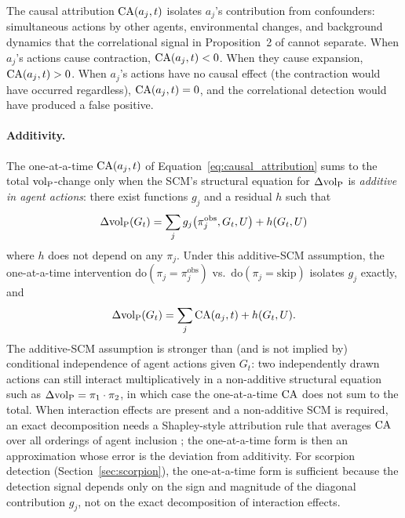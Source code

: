 The causal attribution $\mathrm{CA}(a_j, t)$ isolates $a_j$'s contribution
from confounders: simultaneous actions by other agents, environmental
changes, and background dynamics that the correlational signal in
Proposition~2 of \citet{lasser2026gfm} cannot separate. When $a_j$'s
actions cause contraction, $\mathrm{CA}(a_j, t) < 0$. When they cause
expansion, $\mathrm{CA}(a_j, t) > 0$. When $a_j$'s actions have no causal
effect (the contraction would have occurred regardless), $\mathrm{CA}(a_j,
t) = 0$, and the correlational detection would have produced a false
positive.

\paragraph{Additivity.} The one-at-a-time $\mathrm{CA}(a_j, t)$ of
Equation~\eqref{eq:causal_attribution} sums to the total
${\operatorname{vol}_{\mathrm{P}}}$-change only when the SCM's structural equation for
$\Delta {\operatorname{vol}_{\mathrm{P}}}$ is \emph{additive in agent actions}: there exist
functions $g_j$ and a residual $h$ such that
\begin{equation}
\label{eq:additive_scm}
\Delta {\operatorname{vol}_{\mathrm{P}}}(G_t)
    = \sum_j g_j\bigl(\pi_j^{\mathrm{obs}}, G_t, U\bigr)
    + h(G_t, U)
\end{equation}
where $h$ does not depend on any $\pi_j$. Under this additive-SCM
assumption, the one-at-a-time intervention
$\mathrm{do}(\pi_j = \pi_j^{\mathrm{obs}})$ vs.\
$\mathrm{do}(\pi_j = \mathrm{skip})$ isolates $g_j$ exactly, and
\begin{equation}
\label{eq:causal_decomposition}
\Delta {\operatorname{vol}_{\mathrm{P}}}(G_t) = \sum_j \mathrm{CA}(a_j, t) + h(G_t, U).
\end{equation}
The additive-SCM assumption is stronger than (and is not implied by)
conditional independence of agent actions given $G_t$: two
independently drawn actions can still interact multiplicatively in a
non-additive structural equation such as
$\Delta {\operatorname{vol}_{\mathrm{P}}} = \pi_1 \cdot \pi_2$, in which case the one-at-a-time
$\mathrm{CA}$ does not sum to the total. When interaction effects
are present and a non-additive SCM is required, an exact decomposition
needs a Shapley-style attribution rule that averages $\mathrm{CA}$
over all orderings of agent inclusion \citep{shapley1953value}; the
one-at-a-time form is then an approximation whose error is the
deviation from additivity. For scorpion detection
(Section~\ref{sec:scorpion}), the one-at-a-time form is sufficient
because the detection signal depends only on the sign and magnitude
of the diagonal contribution $g_j$, not on the exact decomposition
of interaction effects.

